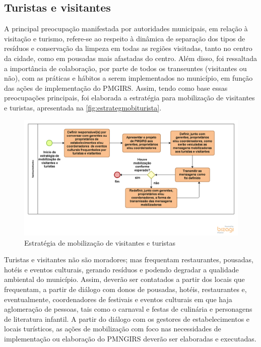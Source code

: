 \subsection{Turistas e visitantes}
A principal preocupação manifestada por autoridades municipais, em relação à visitação e turismo, refere-se ao respeito à dinâmica de separação dos tipos de resíduos e conservação da limpeza em todas as regiões visitadas, tanto no centro da cidade, como em pousadas mais afastadas do centro.  Além disso, foi ressaltada a importância de colaboração, por parte de todos os transeuntes (visitantes ou não), com as práticas e hábitos a serem implementados no município, em função das ações de implementação do PMGIRS. Assim, tendo como base essas preocupações principais, foi elaborada a estratégia para mobilização de visitantes e turistas, apresentada na \autoref{fig:estrategmobiturista}.

\begin{figure}[h!]
	\centering
	\includegraphics[width=\linewidth]{produtos/produm/estrategmobiturista}
	\caption{Estratégia de mobilização de visitantes e turistas}
	\label{fig:estrategmobiturista}
\end{figure}

Turistas e visitantes não são moradores; mas frequentam restaurantes, pousadas, hotéis e eventos culturais, gerando resíduos e podendo degradar a qualidade ambiental do município. Assim, deverão ser contatados a partir dos locais que frequentam, a partir de diálogo com donos de pousadas, hotéis, restaurantes e, eventualmente, coordenadores de festivais e eventos culturais em que haja aglomeração de pessoas, tais como o carnaval e festas de culinária e personagens de literatura infantil. A partir do diálogo com os gestores de estabelecimentos e locais turísticos, as ações de mobilização com foco nas necessidades de implementação ou elaboração do PMNGIRS deverão ser elaboradas e executadas.


